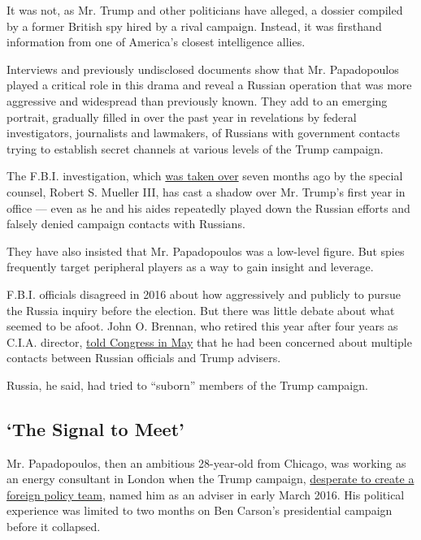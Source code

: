 It was not, as Mr. Trump and other politicians have alleged, a dossier
compiled by a former British spy hired by a rival campaign. Instead, it
was firsthand information from one of America's closest intelligence
allies.

Interviews and previously undisclosed documents show that Mr.
Papadopoulos played a critical role in this drama and reveal a Russian
operation that was more aggressive and widespread than previously known.
They add to an emerging portrait, gradually filled in over the past year
in revelations by federal investigators, journalists and lawmakers, of
Russians with government contacts trying to establish secret channels at
various levels of the Trump campaign.

The F.B.I. investigation, which
\href{https://www.nytimes.com/2017/05/17/us/politics/robert-mueller-special-counsel-russia-investigation.html}{was
taken over} seven months ago by the special counsel, Robert S. Mueller
III, has cast a shadow over Mr. Trump's first year in office --- even as
he and his aides repeatedly played down the Russian efforts and falsely
denied campaign contacts with Russians.

They have also insisted that Mr. Papadopoulos was a low-level figure.
But spies frequently target peripheral players as a way to gain insight
and leverage.

F.B.I. officials disagreed in 2016 about how aggressively and publicly
to pursue the Russia inquiry before the election. But there was little
debate about what seemed to be afoot. John O. Brennan, who retired this
year after four years as C.I.A. director,
\href{https://www.nytimes.com/2017/05/23/us/politics/congress-testimony-john-brennan-russia-budget.html}{told
Congress in May} that he had been concerned about multiple contacts
between Russian officials and Trump advisers.

Russia, he said, had tried to ``suborn'' members of the Trump campaign.

\hypertarget{the-signal-to-meet}{%
\subsection{`The Signal to Meet'}\label{the-signal-to-meet}}

Mr. Papadopoulos, then an ambitious 28-year-old from Chicago, was
working as an energy consultant in London when the Trump campaign,
\href{https://www.nytimes.com/2017/10/31/us/trump-foreign-policy-advisers.html}{desperate
to create a foreign policy team}, named him as an adviser in early March
2016. His political experience was limited to two months on Ben Carson's
presidential campaign before it collapsed.

